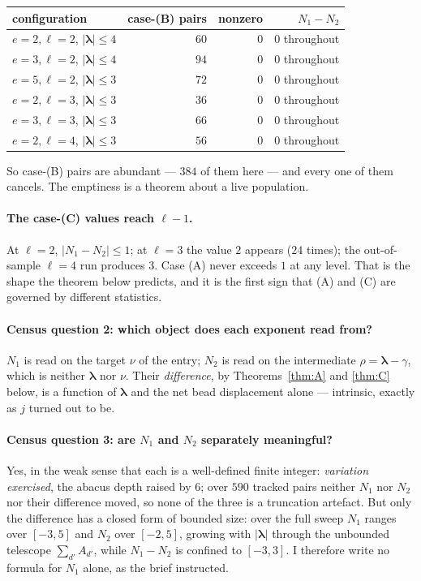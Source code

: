 \documentclass[11pt]{article}
\theoremstyle{definition}
\theoremstyle{remark}
\newcommand{\bl}{\boldsymbol{\lambda}}
\begin{document}
\begin{center}
\begin{tabular}{lrrr}
\hline
configuration & case-(B) pairs & nonzero & $N_1-N_2$ \\
\hline
$e{=}2,\ell{=}2$, $|\bl|\le4$ & $60$ & $0$ & $0$ throughout\\
$e{=}3,\ell{=}2$, $|\bl|\le4$ & $94$ & $0$ & $0$ throughout\\
$e{=}5,\ell{=}2$, $|\bl|\le3$ & $72$ & $0$ & $0$ throughout\\
$e{=}2,\ell{=}3$, $|\bl|\le3$ & $36$ & $0$ & $0$ throughout\\
$e{=}3,\ell{=}3$, $|\bl|\le3$ & $66$ & $0$ & $0$ throughout\\
$e{=}2,\ell{=}4$, $|\bl|\le3$ & $56$ & $0$ & $0$ throughout\\
\hline
\end{tabular}
\end{center}

So case-(B) pairs are abundant --- $384$ of them here --- and every one of them cancels.
The emptiness is a theorem about a live population.

\paragraph{The case-(C) values reach $\ell-1$.} At $\ell=2$, $|N_1-N_2|\le1$; at
$\ell=3$ the value $2$ appears ($24$ times); the out-of-sample $\ell=4$ run produces $3$.
Case (A) never exceeds $1$ at any level. That is the shape the theorem below predicts,
and it is the first sign that (A) and (C) are governed by different statistics.

\paragraph{Census question 2: which object does each exponent read from?} $N_1$ is read
on the target $\nu$ of the entry; $N_2$ is read on the intermediate
$\rho=\bl-\gamma$, which is neither $\bl$ nor $\nu$. Their \emph{difference}, by
Theorems~\ref{thm:A} and \ref{thm:C} below, is a function of $\bl$ and the net bead
displacement alone --- intrinsic, exactly as $j$ turned out to be.

\paragraph{Census question 3: are $N_1$ and $N_2$ separately meaningful?} Yes, in the
weak sense that each is a well-defined finite integer: \emph{variation exercised}, the
abacus depth raised by $6$; over $590$ tracked pairs neither $N_1$ nor $N_2$ nor their
difference moved, so none of the three is a truncation artefact. But only the difference
has a closed form of bounded size: over the full sweep $N_1$ ranges over $[-3,5]$ and
$N_2$ over $[-2,5]$, growing with $|\bl|$ through the unbounded telescope
$\sum_{d'}A_{d'}$, while $N_1-N_2$ is confined to $[-3,3]$. I therefore write no formula
for $N_1$ alone, as the brief instructed.
\end{document}
